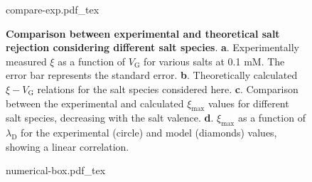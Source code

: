 \begin{figure}[H]
  \centering
  {compare-exp.pdf_tex}
  \caption{\textbf{Comparison between experimental and theoretical
      salt rejection considering different salt
      species}. \textbf{a}. Experimentally measured $\xi$ as a
    function of $V_{\mathrm{G}}$ for various salts at 0.1 mM. The
    error bar represents the standard error. \textbf{b}. Theoretically
    calculated $\xi-V_{\mathrm{G}}$ relations for the salt species
    considered here. \textbf{c}. Comparison between the experimental
    and calculated $\xi_{\mathrm{max}}$ values for different salt
    species, decreasing with the salt
    valence. \textbf{d}. $\xi_{\mathrm{max}}$ as a function of
    $\lambda_{\mathrm{D}}$ for the experimental (circle) and model
    (diamonds) values, showing a linear correlation.}
  \label{fig:np-6}
\end{figure}


\begin{figure}[!htbp]
  \centering
  {numerical-box.pdf_tex}
  \caption{\label{fig:nanopore-simu-box}}
\end{figure}




